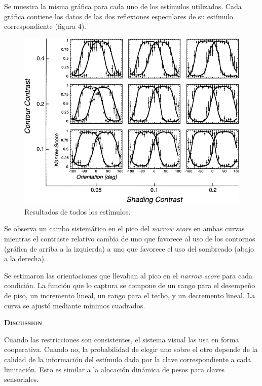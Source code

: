 \documentclass[a4paper,12pt]{article}
\begin{document}
Se muestra la misma gráfica para cada uno de los estímulos utilizados. Cada gráfica contiene los datos de las dos reflexiones especulares de su estímulo correspondiente (figura 4).

\begin{figure}[ht]
	\begin{center}
		\includegraphics[scale=0.5]{Mamassian2001a(4).png}
		\caption{Resultados de todos los estímulos.}
	\end{center}
\end{figure}

Se observa un cambo sistemático en el pico del {\itshape narrow score} en ambas curvas mientras el contraste relativo cambia de uno que favorece al uso de los contornos (gráfica de arriba a la izquierda) a uno que favorece el uso del sombreado (abajo a la derecha).

Se estimaron las orientaciones que llevaban al pico en el {\itshape narrow score} para cada condición. La función que lo captura se compone de un rango para el desempeño de piso, un incremento lineal, un rango para el techo, y un decremento lineal. La curva se ajustó mediante mínimos cuadrados.

{\scshape\bfseries Discussion}

Cuando las restricciones son consistentes, el sistema visual las usa en forma cooperativa. Cuando no, la probabilidad de elegir uno sobre el otro depende de la calidad de la información del estímulo dada por la clave correspondiente a cada limitación. Esto es similar a la alocación dinámica de pesos para claves sensoriales.
\end{document}
